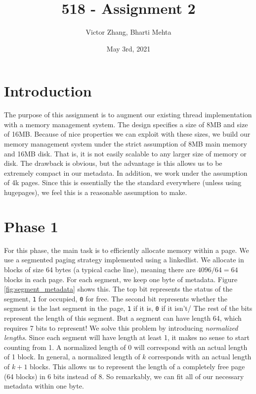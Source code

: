 \documentclass{article}
\title{518 - Assignment 2}
\author{Victor Zhang, Bharti Mehta}
\date{May 3rd, 2021}
\begin{document}
\maketitle

\section{Introduction}
The purpose of this assignment is to augment our existing thread implementation with a memory management system. The design specifies a  size of 8MB and  size of 16MB. Because of nice properties we can exploit with these sizes, we build our memory management system under the strict assumption of 8MB main memory and 16MB disk. That is, it is not easily scalable to any larger size of memory or disk. The drawback is obvious, but the advantage is this allows us to be extremely compact in our metadata. In addition, we work under the assumption of 4k pages. Since this is essentially the the standard everywhere (unless using hugepages), we feel this is a reasonable assumption to make.

\section{Phase 1}
For this phase, the main task is to efficiently allocate memory within a page.
We use a segmented paging strategy implemented using a linkedlist. We allocate
in blocks of size 64 bytes (a typical cache line), meaning there are
$4096/64 = 64$ blocks in each page. For each segment, we keep one byte of
metadata. Figure \ref{fig:segment_metadata} shows this. The top bit represents
the status of the segment, \verb|1| for occupied, \verb|0| for free. The second bit represents whether the segment is the last segment in the page, \verb|1| if it is, \verb|0| if it isn't/ The rest of
the bits represent the length of this segment. But a segment can have length 64,
which requires 7 bits to represent! We solve this problem by introducing
\textit{normalized lengths}. Since each segment will have length at least 1, it
makes no sense to start counting from 1. A normalized length of 0 will
correspond with an actual length of 1 block. In general, a normalized length of
$k$ corresponds with an actual length of $k+1$ blocks. This  allows us to
represent the length of a completely free page (64 blocks) in 6 bits instead of
8. So remarkably, we can fit all of our necessary metadata within one byte.
\end{document}
